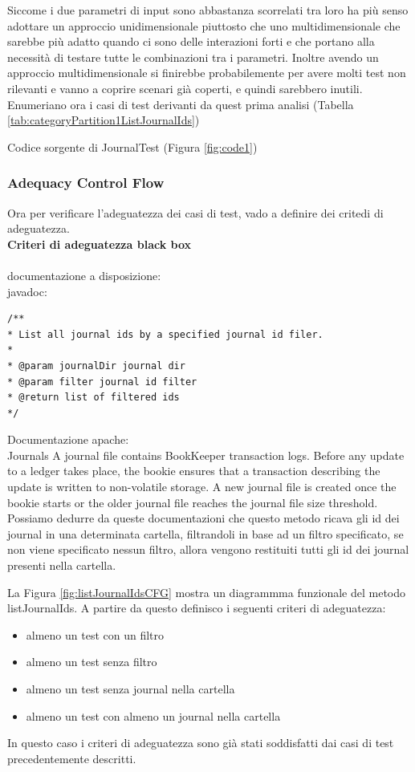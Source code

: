 \documentclass[12pt, a4paper]{article}
\begin{document}
Siccome i due parametri di input sono abbastanza scorrelati tra loro ha più senso adottare un approccio 
unidimensionale piuttosto che uno multidimensionale che sarebbe più adatto quando ci sono delle interazioni forti
e che portano alla necessità di testare tutte le combinazioni tra i parametri. Inoltre avendo un approccio multidimensionale
si finirebbe probabilemente per avere molti test non rilevanti e vanno a coprire scenari già coperti, e quindi sarebbero inutili.
\\ Enumeriano ora i casi di test derivanti da quest prima analisi (Tabella \ref{tab:categoryPartition1ListJournalIds})

Codice sorgente di JournalTest (Figura \ref{fig:code1})

\subsubsection{Adequacy Control Flow}
Ora per verificare l'adeguatezza dei casi di test, vado a definire dei critedi di adeguatezza. \\
\textbf{Criteri di adeguatezza black box}
\paragraph{} 
documentazione a disposizione:  \\
javadoc:
\begin{verbatim}
/**
* List all journal ids by a specified journal id filer.
*
* @param journalDir journal dir
* @param filter journal id filter
* @return list of filtered ids
*/
\end{verbatim} 
Documentazione apache: \\
Journals
A journal file contains BookKeeper transaction logs. 
Before any update to a ledger takes place, the bookie ensures that a transaction describing 
the update is written to non-volatile storage. A new journal file is created once the bookie 
starts or the older journal file reaches the journal file size threshold. \\

Possiamo dedurre da queste documentazioni che questo metodo ricava gli id dei journal in una 
determinata cartella, filtrandoli in base ad un filtro specificato, se non viene specificato 
nessun filtro, allora vengono restituiti tutti gli id dei journal presenti nella cartella.

La Figura \ref{fig:listJournalIdsCFG} mostra un diagrammma 
funzionale del metodo listJournalIds.
A partire da questo definisco i seguenti criteri di adeguatezza:
\begin{itemize}
  \item almeno un test con un filtro
  \item almeno un test senza filtro
  \item almeno un test senza journal nella cartella
  \item almeno un test con almeno un journal nella cartella
\end{itemize}
In questo caso i criteri di adeguatezza sono già stati soddisfatti 
dai casi di test precedentemente descritti. \\
\end{document}
